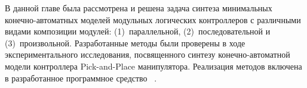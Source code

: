 \vspace{3ex}
\chapterconclusion

В данной главе была рассмотрена и решена задача синтеза минимальных конечно-автоматных моделей модульных логических контроллеров с различными видами композиции модулей: (1)~параллельной, (2)~последовательной и (3)~произвольной.
Разработанные методы были проверены в ходе экспериментального исследования, посвященного синтезу конечно-автоматной модели контроллера Pick-and-Place манипулятора.
Реализация методов включена в разработанное программное средство ~\cite{fbSAT-tool}.

